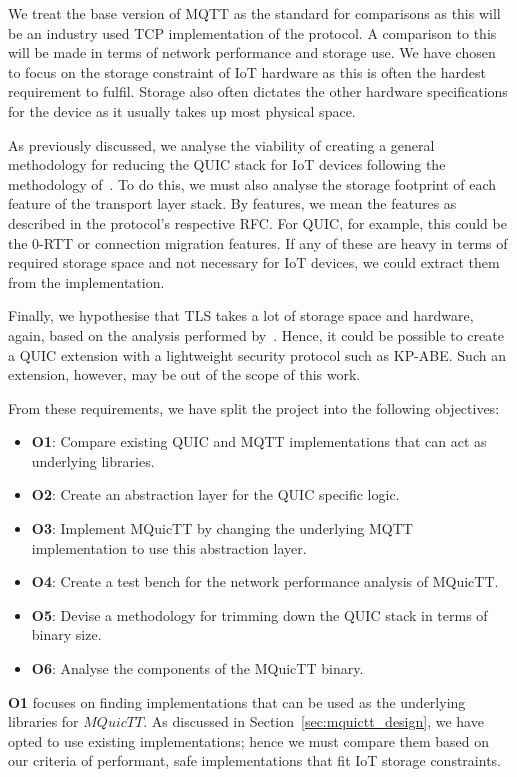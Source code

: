 We treat the base version of MQTT as the standard for comparisons as this will be an industry used TCP implementation of the protocol.
A comparison to this will be made in terms of network performance and storage use.
We have chosen to focus on the storage constraint of IoT hardware as this is often the hardest requirement to fulfil.
Storage also often dictates the other hardware specifications for the device as it usually takes up most physical space.

As previously discussed, we analyse the viability of creating a general methodology for reducing the QUIC stack for IoT devices following the methodology of~\cite{eggert_towards_2020}.
To do this, we must also analyse the storage footprint of each feature of the transport layer stack.
By features, we mean the features as described in the protocol's respective RFC.
For QUIC, for example, this could be the 0-RTT or connection migration features.
If any of these are heavy in terms of required storage space and not necessary for IoT devices, we could extract them from the implementation.

Finally, we hypothesise that TLS takes a lot of storage space and hardware, again, based on the analysis performed by~\cite{eggert_towards_2020}.
Hence, it could be possible to create a QUIC extension with a lightweight security protocol such as KP-ABE.
Such an extension, however, may be out of the scope of this work.

From these requirements, we have split the project into the following objectives:

\begin{itemize}
    \item \textbf{O1}: Compare existing QUIC and MQTT implementations that can act as underlying libraries.
    \item \textbf{O2}: Create an abstraction layer for the QUIC specific logic.
    \item \textbf{O3}: Implement MQuicTT by changing the underlying MQTT implementation to use this abstraction layer.
    \item \textbf{O4}: Create a test bench for the network performance analysis of MQuicTT.
    \item \textbf{O5}: Devise a methodology for trimming down the QUIC stack in terms of binary size.
    \item \textbf{O6}: Analyse the components of the MQuicTT binary.
\end{itemize}

\textbf{O1} focuses on finding implementations that can be used as the underlying libraries for $MQuicTT$.
As discussed in Section~\ref{sec:mquictt_design}, we have opted to use existing implementations; hence we must compare them based on our criteria of performant, safe implementations that fit IoT storage constraints.

